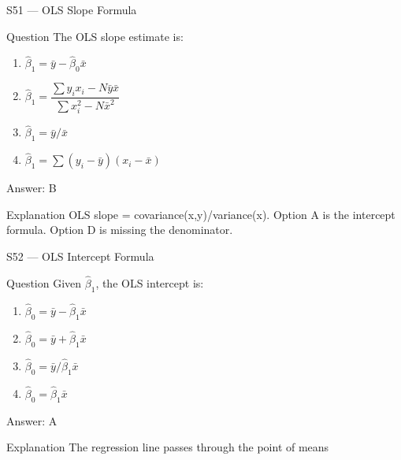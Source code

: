 \documentclass[aspectratio=169,8pt]{beamer}
\begin{document}
	\begin{frame}{S51 --- OLS Slope Formula}
		\begin{block}{Question}
			The OLS slope estimate is:
			\begin{enumerate}
				\item $\hat{\beta}_1 = \bar{y} - \hat{\beta}_0 \bar{x}$
				\item $\hat{\beta}_1 = \dfrac{\sum y_i x_i - N\bar{y}\bar{x}}{\sum x_i^2 - N\bar{x}^2}$
				\item $\hat{\beta}_1 = \bar{y}/\bar{x}$
				\item $\hat{\beta}_1 = \sum(y_i - \bar{y})(x_i - \bar{x})$
			\end{enumerate}
		\end{block}
		\begin{exampleblock}{Answer: B}\end{exampleblock}
		\begin{block}{Explanation}
			OLS slope = covariance(x,y)/variance(x). Option A is the intercept formula. Option D is missing the denominator.
		\end{block}
	\end{frame}
	
	\begin{frame}{S52 --- OLS Intercept Formula}
		\begin{block}{Question}
			Given $\hat{\beta}_1$, the OLS intercept is:
			\begin{enumerate}
				\item $\hat{\beta}_0 = \bar{y} - \hat{\beta}_1 \bar{x}$
				\item $\hat{\beta}_0 = \bar{y} + \hat{\beta}_1 \bar{x}$
				\item $\hat{\beta}_0 = \bar{y}/\hat{\beta}_1 \bar{x}$
				\item $\hat{\beta}_0 = \hat{\beta}_1 \bar{x}$
			\end{enumerate}
		\end{block}
		\begin{exampleblock}{Answer: A}\end{exampleblock}
		\begin{block}{Explanation}
			The regression line passes through the point of means
		\end{block}
	\end{frame}
	
\end{document}
